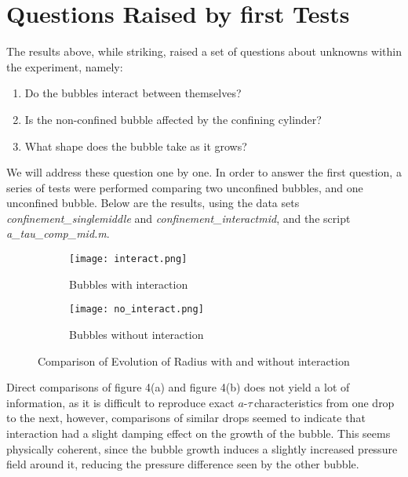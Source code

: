 \documentclass{article}
\newcommand{\at}{$a$-$\tau$\,}
\begin{document}
\section{Questions Raised by first Tests}
The results above, while striking, raised a set of questions about unknowns within the experiment, namely:
\begin{enumerate}
    \item Do the bubbles interact between themselves?
    \item Is the non-confined bubble affected by the confining cylinder?
    \item What shape does the bubble take as it grows?
\end{enumerate}
We will address these question one by one. In order to answer the first question, a series of tests were performed comparing two unconfined bubbles, and one unconfined bubble. Below are the results, using the data sets \emph{confinement\_singlemiddle} and \emph{confinement\_interactmid}, and the script \emph{a\_tau\_comp\_mid.m}.
\begin{figure}[H]
  \centering
  \begin{subfigure}[b]{0.49\linewidth}
    \texttt{[image: interact.png]}
    \caption{Bubbles with interaction}
  \end{subfigure}
  \begin{subfigure}[b]{0.49\linewidth}
    \texttt{[image: no\_interact.png]}
    \caption{Bubbles without interaction}
  \end{subfigure}
  \caption{Comparison of Evolution of Radius with and without interaction}
\end{figure}
Direct comparisons of figure 4(a) and figure 4(b) does not yield a lot of information, as it is difficult to reproduce exact \at characteristics from one drop to the next, however, comparisons of similar drops seemed to indicate that interaction had a slight damping effect on the growth of the bubble. This seems physically coherent, since the bubble growth induces a slightly increased pressure field around it, reducing the pressure difference seen by the other bubble.
\end{document}

